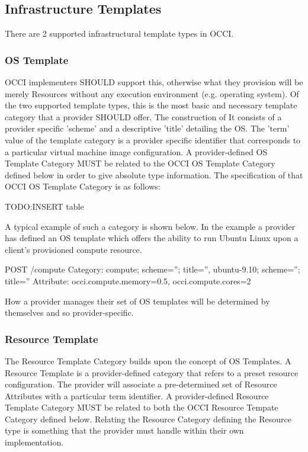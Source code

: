 \documentclass[10pt,a4paper]{article}
\begin{document}
\subsection{Infrastructure Templates}
There are 2 supported infrastructural template types in OCCI.

\subsubsection{OS Template}
OCCI implementers SHOULD support this, otherwise what they provision will be merely Resources without any execution environment (e.g. operating system). Of the two supported template types, this is the most basic and necessary template category that a provider SHOULD offer. The construction of It consists of a provider specific 'scheme' and a descriptive 'title' detailing the OS. The 'term' value of the template category is a provider specific identifier that corresponds to a particular virtual machine image configuration. A provider-defined OS Template Category MUST be related to the OCCI OS Template Category defined below in order to give absolute type information. The specification of that OCCI OS Template Category is as follows:

TODO:INSERT table

A typical example of such a category is shown below. In the example a provider has defined an OS template which offers the ability to run Ubuntu Linux upon a client's provisioned compute resource.

POST /compute
Category: compute; scheme=''; title='', ubuntu-9.10; scheme=''; title=''
Attribute: occi.compute.memory=0.5, occi.compute.cores=2

How a provider manages their set of OS templates will be determined by themselves and so provider-specific.

\subsubsection{Resource Template}
The Resource Template Category builds upon the concept of OS Templates. A Resource Template is a provider-defined category that refers to a preset resource configuration. The provider will associate a pre-determined set of Resource Attributes with a particular term identifier. A provider-defined Resource Template Category MUST be related to both the OCCI Resource Tempate Category defined below. Relating the Resource Category defining the Resource type is something that the provider must handle within their own implementation.
\end{document}
